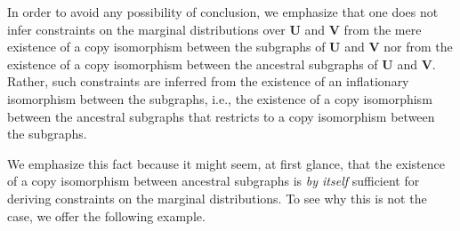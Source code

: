 In order to avoid any possibility of conclusion, we emphasize that one does not infer constraints on the marginal distributions over $\bm{U}$ and $\bm{V}$ from the mere existence of a copy isomorphism between the subgraphs of $\bm{U}$ and $\bm{V}$ nor from the existence of a copy isomorphism between the ancestral subgraphs of $\bm{U}$ and $\bm{V}$.   Rather, such constraints are inferred from the existence of an inflationary isomorphism between the subgraphs, i.e., the existence of a copy isomorphism between the ancestral subgraphs that restricts to a copy isomorphism between the subgraphs.  

We emphasize this fact because it might seem, at first glance, that the existence of a copy isomorphism between ancestral subgraphs is {\em by itself} sufficient for deriving constraints on the marginal distributions.  To see why this is not the case, we offer the following example.

